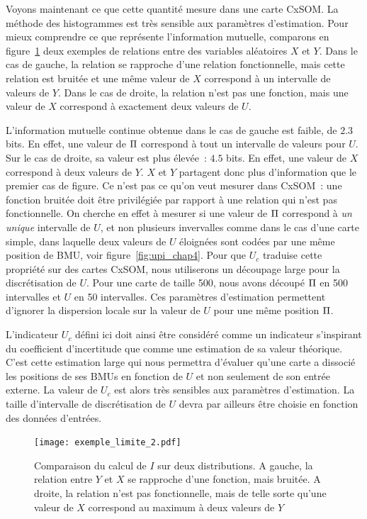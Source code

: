 \documentclass[../main]{subfiles}
\begin{document}
Voyons maintenant ce que cette quantité mesure dans une carte CxSOM.
La méthode des histogrammes est très sensible aux paramètres d'estimation. 
Pour mieux comprendre ce que représente l'information mutuelle, comparons en figure~\ref{fig:exemple-limite} deux exemples de relations entre des variables aléatoires $X$ et $Y$.
Dans le cas de gauche, la relation se rapproche d'une relation fonctionnelle, mais cette relation est bruitée et une même valeur de $X$ correspond à un intervalle de valeurs de $Y$. Dans le cas de droite, la relation n'est pas une fonction, mais une valeur de $X$ correspond à exactement deux valeurs de $U$.

L'information mutuelle continue obtenue dans le cas de gauche est faible, de $2.3$ bits.
En effet, une valeur de $\Pi$ correspond à tout un intervalle de valeurs pour $U$. 
Sur le cas de droite, sa valeur est plus élevée~: $4.5$ bits. En effet, une valeur de $X$ correspond à deux valeurs de $Y$. $X$ et $Y$ partagent donc plus d'information que le premier cas de figure.
Ce n'est pas ce qu'on veut mesurer dans CxSOM~: une fonction bruitée doit être privilégiée par rapport à une relation qui n'est pas fonctionnelle.
On cherche en effet à mesurer si une valeur de $\Pi$ correspond à \emph{un unique} intervalle de $U$, et non plusieurs invervalles comme dans le cas d'une carte simple, dans laquelle deux valeurs de $U$ éloignées sont codées par une même position de BMU, voir figure~\ref{fig:upi_chap4}.
Pour que $U_c$ traduise cette propriété sur des cartes CxSOM, nous utiliserons un découpage large pour la discrétisation de $U$. Pour une carte de taille 500, nous avons découpé $\Pi$ en 500 intervalles et $U$ en 50 intervalles.
Ces paramètres d'estimation permettent d'ignorer la dispersion locale sur la valeur de $U$ pour une même position $\Pi$.

L'indicateur $U_c$ défini ici doit ainsi être considéré comme un indicateur s'inspirant du coefficient d'incertitude que comme une estimation de sa valeur théorique.
C'est cette estimation large qui nous permettra d'évaluer qu'une carte a dissocié les positions de ses BMUs en fonction de $U$ et non seulement de son entrée externe.
La valeur de $U_c$ est alors très sensibles aux paramètres d'estimation. 
La taille d'intervalle de discrétisation de $U$ devra par ailleurs être choisie en fonction des données d'entrées.

\begin{figure}
    \centering
    \texttt{[image: exemple\_limite\_2.pdf]}
    \caption{Comparaison du calcul de  $I$ sur deux distributions. A gauche, la relation entre $Y$ et $X$ se rapproche d'une fonction, mais bruitée. A droite, la relation n'est pas fonctionnelle, mais de telle sorte qu'une valeur de $X$ correspond au maximum à deux valeurs de $Y$}
    \label{fig:exemple-limite}
    \end{figure}
\end{document}
